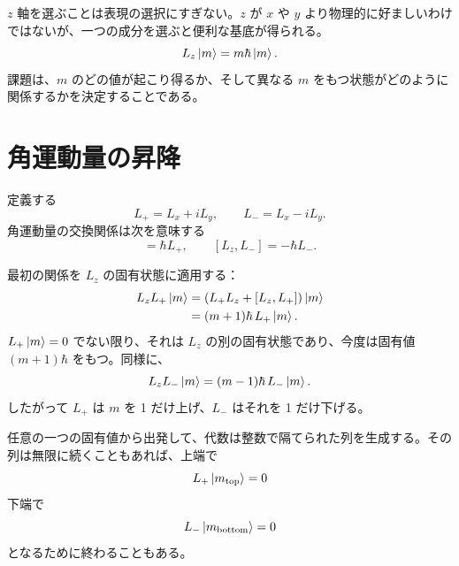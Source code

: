 \(z\) 軸を選ぶことは表現の選択にすぎない。\(z\) が \(x\) や \(y\) より物理的に好ましいわけではないが、一つの成分を選ぶと便利な基底が得られる。
\begin{equation}
L_z\left\lvert m\right\rangle=m\hbar\left\lvert m\right\rangle.
\end{equation}
課題は、\(m\) のどの値が起こり得るか、そして異なる \(m\) をもつ状態がどのように関係するかを決定することである。

\begin{classroomqa}
\end{classroomqa}

\section{角運動量の昇降}

定義する
\begin{equation}
L_+=L_x+iL_y,
\qquad
L_-=L_x-iL_y.
\end{equation}
角運動量の交換関係は次を意味する
\begin{equation}
[L_z,L_+]=\hbar L_+,
\qquad
[L_z,L_-]=-\hbar L_-.
\end{equation}

最初の関係を \(L_z\) の固有状態に適用する：
\begin{align}
L_zL_+\left\lvert m\right\rangle
&=\left(L_+L_z+[L_z,L_+]\right)\left\lvert m\right\rangle\\
&=(m+1)\hbar\,L_+\left\lvert m\right\rangle.
\end{align}
\(L_+\left\lvert m\right\rangle=0\) でない限り、それは \(L_z\) の別の固有状態であり、今度は固有値 \((m+1)\hbar\) をもつ。同様に、
\begin{equation}
L_zL_-\left\lvert m\right\rangle
=(m-1)\hbar\,L_-\left\lvert m\right\rangle.
\end{equation}
したがって \(L_+\) は \(m\) を 1 だけ上げ、\(L_-\) はそれを 1 だけ下げる。

任意の一つの固有値から出発して、代数は整数で隔てられた列を生成する。その列は無限に続くこともあれば、上端で
\begin{equation}
L_+\left\lvert m_{\mathrm{top}}\right\rangle=0
\end{equation}
下端で
\begin{equation}
L_-\left\lvert m_{\mathrm{bottom}}\right\rangle=0
\end{equation}
となるために終わることもある。

